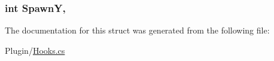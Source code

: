 \subsubsection[{Spawn\+Y}]{\setlength{\rightskip}{0pt plus 5cm}int Spawn\+Y\hspace{0.3cm}{\ttfamily [get]}, {\ttfamily [set]}}\label{structOTA_1_1Plugin_1_1HookArgs_1_1WorldRequestMessage_a23f27a069556fb8443d56c38a6d0c711}


The documentation for this struct was generated from the following file\+:\begin{DoxyCompactItemize}
\item 
Plugin/\hyperlink{Hooks_8cs}{Hooks.\+cs}\end{DoxyCompactItemize}
